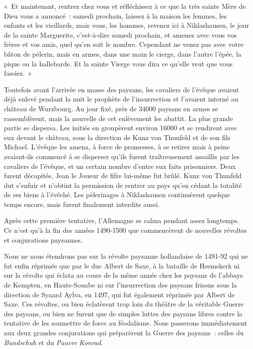\documentclass[french,twoside]{book} %
\newenvironment{quoteblock}%
  {\begin{quoting}}
  {\end{quoting}}
\newenvironment{quotebar}{%
    \def\FrameCommand{{\color{rubric!10!}\vrule width 0.5em} \hspace{0.9em}}%
    \def\OuterFrameSep{\itemsep} %
    \MakeFramed {\advance\hsize-\width \FrameRestore}
  }%
  {%
    \endMakeFramed
  }
\renewenvironment{quoteblock}%
  {%
    \savenotes
    \setstretch{0.9}
    \normalfont
    \begin{quotebar}
  }
  {%
    \end{quotebar}
    \spewnotes
  }
\begin{document}
\begin{quoteblock}
 \noindent « Et maintenant, rentrez chez vous et réfléchissez à ce que la très sainte Mère de Dieu vous a annoncé : samedi prochain, laissez à la maison les femmes, les enfants et les vieillards, mais vous, les hommes, revenez ici à Niklashausen, le jour de la sainte Marguerite, c’est-à-dire samedi prochain, et amenez avec vous vos frères et vos amis, quel qu’en soit le nombre. Cependant ne venez pas avec votre bâton de pèlerin, mais en armes, dans une main le cierge, dans l’autre l’épée, la pique ou la hallebarde. Et la sainte Vierge vous dira ce qu’elle veut que vous fassiez. »
\end{quoteblock}

\noindent Toutefois avant l’arrivée en masse des paysans, les cavaliers de l’évêque avaient déjà enlevé pendant la nuit le prophète de l’insurrection et l’avaient interné au château de Wurzbourg. Au jour fixé, près de 34000 paysans en armes se rassemblèrent, mais la nouvelle de cet enlèvement les abattit. La plus grande partie se dispersa. Les initiés en groupèrent environ 16000 et se rendirent avec eux devant le château, sous la direction de Kunz von Thunfeld et de son fils Michael. L’évêque les amena, à force de promesses, à se retirer mais à peine avaient-ils commencé à se disperser qu’ils furent traîtreusement assaillis par les cavaliers de l’évêque, et un certain nombre d’entre eux faits prisonniers. Deux furent décapités, Jean le Joueur de fifre lui-même fut brûlé. Kunz von Thunfeld dut s’enfuir et n’obtint la permission de rentrer au pays qu’en cédant la totalité de ses biens à l’évêché. Les pèlerinages à Niklashausen continuèrent quelque temps encore, mais furent finalement interdits aussi.\par
Après cette première tentative, l’Allemagne se calma pendant assez longtemps. Ce n’est qu’à la fin des années 1490-1500 que commencèrent de nouvelles révoltes et conjurations paysannes.\par
Nous ne nous étendrons pas sur la révolte paysanne hollandaise de 1491-92 qui ne fut enfin réprimée que par le duc Albert de Saxe, à la bataille de Heemskerk ni sur la révolte qui éclata au cours de la même année chez les paysans de l’abbaye de Kempten, en Haute-Souabe ni sur l’insurrection des paysans frisons sous la direction de Syaard Aylva, en 1497, qui fut également réprimée par Albert de Saxe. Ces révoltes, ou bien éclatèrent trop loin du théâtre de la véritable Guerre des paysans, ou bien ne furent que de simples luttes des paysans libres contre la tentative de les soumettre de force au féodalisme. Nous passerons immédiatement aux deux grandes conjurations qui préparèrent la Guerre des paysans : celles du \emph{Bundschuh} et du \emph{Pauvre Konrad}.\par
\end{document}
